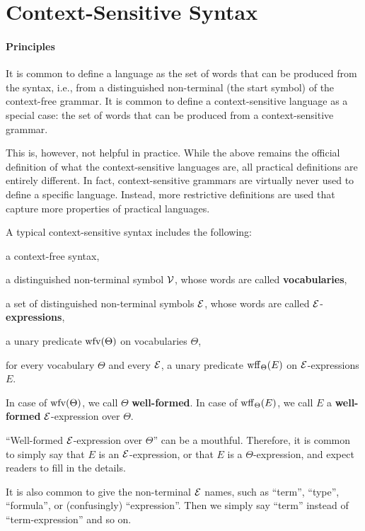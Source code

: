 \section{Context-Sensitive Syntax}

\paragraph{Principles}
It is common to define a language as the set of words that can be produced from the syntax, i.e., from a distinguished non-terminal (the start symbol) of the context-free grammar.
It is common to define a context-sensitive language as a special case: the set of words that can be produced from a context-sensitive grammar.

This is, however, not helpful in practice.
While the above remains the official definition of what the context-sensitive languages are, all practical definitions are entirely different.
In fact, context-sensitive grammars are virtually never used to define a specific language.
Instead, more restrictive definitions are used that capture more properties of practical languages.

A typical context-sensitive syntax includes the following:
\begin{compactitem}
 \item a context-free syntax,
 \item a distinguished non-terminal symbol $\mathcal{V}$, whose words are called \textbf{vocabularies},
 \item a set of distinguished non-terminal symbols $\mathcal{E}$, whose words are called $\mathcal{E}$-\textbf{expressions},
 \item a unary predicate $\mathrm{wfv}(\Theta)$ on vocabularies $\Theta$,
 \item for every vocabulary $\Theta$ and every $\mathcal{E}$, a unary predicate $\mathrm{wff}_{\Theta}(E)$ on $\mathcal{E}$-expressions $E$.
\end{compactitem}
In case of $\mathrm{wfv}(\Theta)$, we call $\Theta$ \textbf{well-formed}.
In case of $\mathrm{wff}_{\Theta}(E)$, we call $E$ a \textbf{well-formed} $\mathcal{E}$-expression over $\Theta$.

\begin{remark}[Terminology]
``Well-formed $\mathcal{E}$-expression over $\Theta$'' can be a mouthful.
Therefore, it is common to simply say that $E$ is an $\mathcal{E}$-expression, or that $E$ is a $\Theta$-expression, and expect readers to fill in the details.

It is also common to give the non-terminal $\mathcal{E}$ names, such as ``term'', ``type'', ``formula'', or (confusingly) ``expression''.
Then we simply say ``term'' instead of ``term-expression'' and so on.
\end{remark}

